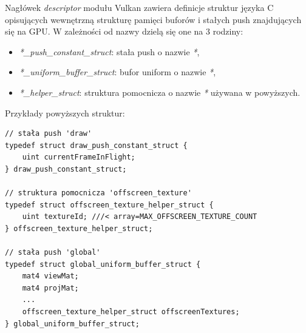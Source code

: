 Nagłówek \textit{descriptor} modułu Vulkan zawiera definicje struktur języka C opisujących wewnętrzną strukturę pamięci buforów i stałych push znajdujących się na GPU.
W zależności od nazwy dzielą się one na 3 rodziny:
\begin{itemize}
	\item \textit{*\_push\_constant\_struct}: stała push o nazwie \textit{*},
	\item \textit{*\_uniform\_buffer\_struct}: bufor uniform o nazwie \textit{*},
	\item \textit{*\_helper\_struct}: struktura pomocnicza o nazwie \textit{*} używana w powyższych.
\end{itemize}
Przykłady powyższych struktur:
\lstset{language=C}
\begin{lstlisting}[caption={Przykładowe struktury w nagłówku descriptor opisujące wewnętrzną strukturę deskryptorów},captionpos=b]
// stała push 'draw'
typedef struct draw_push_constant_struct {
	uint currentFrameInFlight;
} draw_push_constant_struct;

// struktura pomocnicza 'offscreen_texture'
typedef struct offscreen_texture_helper_struct {
	uint textureId; ///< array=MAX_OFFSCREEN_TEXTURE_COUNT
} offscreen_texture_helper_struct;

// stała push 'global'
typedef struct global_uniform_buffer_struct {
	mat4 viewMat;
	mat4 projMat;
	...
	offscreen_texture_helper_struct offscreenTextures;
} global_uniform_buffer_struct;
\end{lstlisting}

